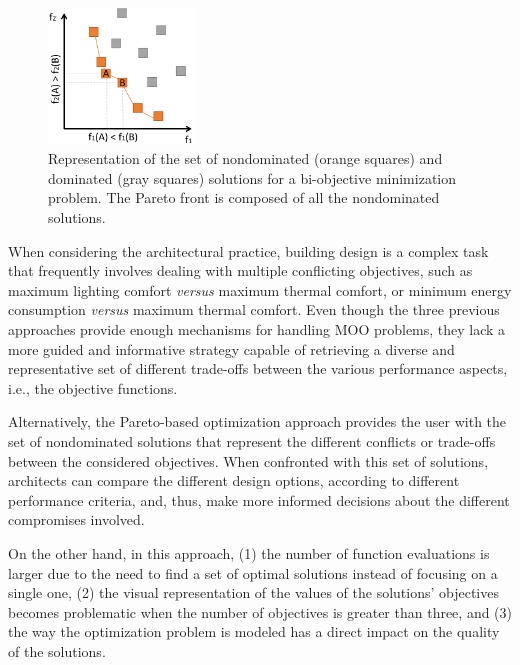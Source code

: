 	\begin{figure}
		\centering
		\includegraphics[width=0.35\textwidth]{Images/Background/pareto-front.PNG}
		\caption[Representation of a Pareto front example for a bi-objective optimization problem]{Representation of the set of nondominated (orange squares) and dominated (gray squares) solutions for a bi-objective minimization problem. The Pareto front is composed of all the nondominated solutions.}
		\label{fig:paretofrontier}
	\end{figure}
	
	When considering the architectural practice, building design is a complex task that frequently involves dealing with multiple conflicting objectives, such as maximum lighting comfort \textit{versus} maximum thermal comfort, or minimum energy consumption \textit{versus} maximum thermal comfort. Even though the three previous approaches provide enough mechanisms for handling \ac{MOO} problems, they lack a more guided and informative strategy capable of retrieving a diverse and representative set of different trade-offs between the various performance aspects, i.e., the objective functions.
	
	Alternatively, the Pareto-based optimization approach provides the user with the set of nondominated solutions that represent the different conflicts or trade-offs between the considered objectives. When confronted with this set of solutions, architects can compare the different design options, according to different performance criteria, and, thus, make more informed decisions about the different compromises involved. 
	
	On the other hand, in this approach, (1) the number of function evaluations is larger due to the need to find a set of optimal solutions instead of focusing on a single one, (2) the visual representation of the values of the solutions' objectives becomes problematic when the number of objectives is greater than three, and (3) the way the optimization problem is modeled has a direct impact on the quality of the solutions.
	
